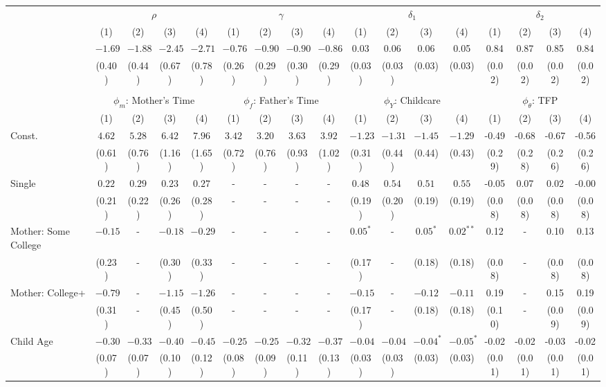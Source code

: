 \begin{tabular}{lcccccccccccccccc}\\\toprule
 & \multicolumn{4}{c}{$\rho$} & \multicolumn{4}{c}{$\gamma$} & \multicolumn{4}{c}{$\delta_{1}$} & \multicolumn{4}{c}{$\delta_{2}$} \\
&(1)&(2)&(3)&(4)&(1)&(2)&(3)&(4)&(1)&(2)&(3)&(4)&(1)&(2)&(3)&(4)\\\cmidrule(r){2-5}\cmidrule(r){6-9}\cmidrule(r){10-13}\cmidrule(r){14-17}
&$-1.69$&$-1.88$&$-2.45$&$-2.71$&$-0.76$&$-0.90$&$-0.90$&$-0.86$&0.03&0.06&0.06&0.05&0.84&0.87&0.85&0.84\\
&(0.40)&(0.44)&(0.67)&(0.78)&(0.26)&(0.29)&(0.30)&(0.29)&(0.03)&(0.03)&(0.03)&(0.03)&(0.02)&(0.02)&(0.02)&(0.02)\\
&&&&&&&&&&&&&&&&\\
 & \multicolumn{4}{c}{$\phi_{m}$: Mother's Time} & \multicolumn{4}{c}{$\phi_{f}$: Father's Time} & \multicolumn{4}{c}{$\phi_{Y}$: Childcare} & \multicolumn{4}{c}{$\phi_{\theta}$: TFP} \\
&(1)&(2)&(3)&(4)&(1)&(2)&(3)&(4)&(1)&(2)&(3)&(4)&(1)&(2)&(3)&(4)\\\cmidrule(r){2-5}\cmidrule(r){6-9}\cmidrule(r){10-13}\cmidrule(r){14-17}
Const.&$4.62$&$5.28$&$6.42$&$7.96$&$3.42$&$3.20$&$3.63$&$3.92$&$-1.23$&$-1.31$&$-1.45$&$-1.29$&-0.49&-0.68&-0.67&-0.56\\
&(0.61)&(0.76)&(1.16)&(1.65)&(0.72)&(0.76)&(0.93)&(1.02)&(0.31)&(0.44)&(0.44)&(0.43)&(0.29)&(0.28)&(0.26)&(0.26)\\
Single&$0.22$&$0.29$&$0.23$&$0.27$&-&-&-&-&$0.48$&$0.54$&$0.51$&$0.55$&-0.05&0.07&0.02&-0.00\\
&(0.21)&(0.22)&(0.26)&(0.28)&-&-&-&-&(0.19)&(0.20)&(0.19)&(0.19)&(0.08)&(0.08)&(0.08)&(0.08)\\
Mother: Some College&$-0.15$&-&$-0.18$&$-0.29$&-&-&-&-&$0.05^{*}$&-&$0.05^{*}$&$0.02^{**}$&0.12&-&0.10&0.13\\
&(0.23)&-&(0.30)&(0.33)&-&-&-&-&(0.17)&-&(0.18)&(0.18)&(0.08)&-&(0.08)&(0.08)\\
Mother: College+&$-0.79$&-&$-1.15$&$-1.26$&-&-&-&-&$-0.15$&-&$-0.12$&$-0.11$&0.19&-&0.15&0.19\\
&(0.31)&-&(0.45)&(0.50)&-&-&-&-&(0.17)&-&(0.18)&(0.18)&(0.10)&-&(0.09)&(0.09)\\
Child Age&$-0.30$&$-0.33$&$-0.40$&$-0.45$&$-0.25$&$-0.25$&$-0.32$&$-0.37$&$-0.04$&$-0.04$&$-0.04^{*}$&$-0.05^{*}$&-0.02&-0.02&-0.03&-0.02\\
&(0.07)&(0.07)&(0.10)&(0.12)&(0.08)&(0.09)&(0.11)&(0.13)&(0.03)&(0.03)&(0.03)&(0.03)&(0.01)&(0.01)&(0.01)&(0.01)\\

\end{tabular}
